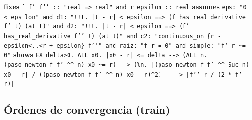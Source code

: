 \documentclass[11pt,a4paper]{article}
\begin{document}
\begin{itemize}
  {\footnotesize \textbf{fixes} \texttt{f f' f'{}' :\allowbreak{}:\allowbreak{} "real =\allowbreak{}> real" and r epsilon :\allowbreak{}:\allowbreak{} real} \textbf{assumes} \texttt{eps:\allowbreak{} "0 < epsilon" and d1:\allowbreak{} "!{}!t. |\allowbreak{}t -\allowbreak{} r|\allowbreak{} < epsilon =\allowbreak{}=\allowbreak{}> (\allowbreak{}f has\_\allowbreak{}real\_\allowbreak{}derivative f' t) (\allowbreak{}at t)" and d2:\allowbreak{} "!{}!t. |\allowbreak{}t -\allowbreak{} r|\allowbreak{} < epsilon =\allowbreak{}=\allowbreak{}> (\allowbreak{}f' has\_\allowbreak{}real\_\allowbreak{}derivative f'{}' t) (\allowbreak{}at t)" and c2:\allowbreak{} "continuous\_\allowbreak{}on \{r -\allowbreak{} epsilon<..<r +\allowbreak{} epsilon\} f'{}'" and raiz:\allowbreak{} "f r =\allowbreak{} 0" and simple:\allowbreak{} "f' r \textasciitilde{}=\allowbreak{} 0"} \textbf{shows} \texttt{EX delta>0. ALL x0. |\allowbreak{}x0 -\allowbreak{} r|\allowbreak{} <=\allowbreak{} delta -\allowbreak{}{}-\allowbreak{}{}> (\allowbreak{}ALL n. (\allowbreak{}paso\_\allowbreak{}newton f f' \textasciicircum{}\textasciicircum{} n) x0 \textasciitilde{}=\allowbreak{} r) -\allowbreak{}{}-\allowbreak{}{}> (\allowbreak{}\%n. |\allowbreak{}(\allowbreak{}paso\_\allowbreak{}newton f f' \textasciicircum{}\textasciicircum{} Suc n) x0 -\allowbreak{} r|\allowbreak{} /\allowbreak{} (\allowbreak{}(\allowbreak{}paso\_\allowbreak{}newton f f' \textasciicircum{}\textasciicircum{} n) x0 -\allowbreak{} r)\textasciicircum{}2) -\allowbreak{}{}-\allowbreak{}{}-\allowbreak{}{}-\allowbreak{}{}> |\allowbreak{}f'{}' r /\allowbreak{} (\allowbreak{}2 *\allowbreak{} f' r)|\allowbreak{}}\par}
\end{itemize}

\subsection{Órdenes de convergencia (train)}
\end{document}
